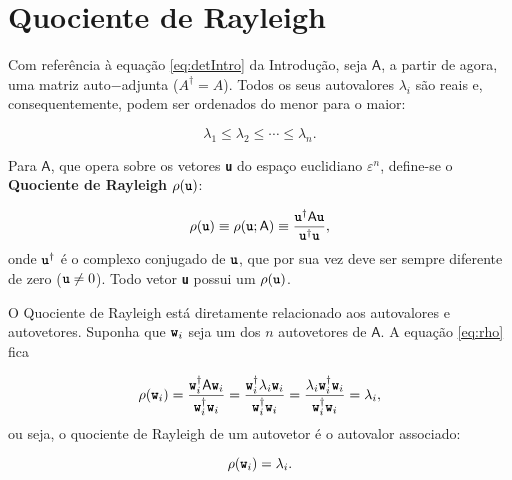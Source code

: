 \chapter{Quociente de Rayleigh\label{cap:algebra}}

Com referência à equação \ref{eq:detIntro} da Introdução, seja $\mathsf{A}$, a partir de agora, uma matriz auto$-$adjunta ($A^{\dag} = A$). Todos os seus autovalores $\lambda_i$ são reais e, consequentemente, podem ser ordenados do menor para o maior:

	\begin{equation}\label{eq:autovalores_ordenados}
		\lambda_1 \leq \lambda_2 \leq \cdots \leq \lambda_n.
	\end{equation}

Para $\mathsf{A}$, que opera sobre os vetores \textbf{\texttt{u}} do espaço euclidiano $\varepsilon^n$, define-se o \textbf{Quociente de Rayleigh} $\rho (\textbf{\texttt{u}})$:

\begin{equation}\label{eq:rho}
	\rho (\textbf{\texttt{u}}) \equiv \rho(\textbf{\texttt{u}}; \mathsf{A}) \equiv \frac{\textbf{\texttt{u}}^\dag \mathsf{A}\textbf{\texttt{u}}}{\textbf{\texttt{u}}^\dag \textbf{\texttt{u}}}, 
\end{equation}
onde $\textbf{\texttt{u}}^\dag$ é o complexo conjugado de $\textbf{\texttt{u}}$, que por sua vez deve ser sempre diferente de zero ($\textbf{\texttt{u}} \neq 0$). Todo vetor \textbf{\texttt{u}} possui um $\rho(\textbf{\texttt{u}})$.

	O Quociente de Rayleigh está diretamente relacionado aos autovalores e autovetores. Suponha que $\textbf{\texttt{w}}_i$ seja um dos $n$ autovetores de $\mathsf{A}$. A equação \ref{eq:rho} fica
	
	\begin{equation}\label{eq:rho_no_w}
		\rho(\textbf{\texttt{w}}_i) = \frac{\textbf{\texttt{w}}_i^\dag \mathsf{A} \textbf{\texttt{w}}_i}{ \textbf{\texttt{w}}_i^\dag \textbf{\texttt{w}}_i} = \frac{\textbf{\texttt{w}}_i^\dag  \lambda_i \textbf{\texttt{w}}_i}{\textbf{\texttt{w}}_i^\dag \textbf{\texttt{w}}_i} = \frac{ \lambda_i \textbf{\texttt{w}}_i^\dag  \textbf{\texttt{w}}_i}{\textbf{\texttt{w}}_i^\dag \textbf{\texttt{w}}_i} = \lambda_i,
	\end{equation}
	ou seja, o quociente de Rayleigh de um autovetor é o autovalor associado:
	
	\begin{equation}\label{eq:rho_no_w_eh_lambda}
		\rho (\textbf{\texttt{w}}_i) = \lambda_i.
	\end{equation}
	
